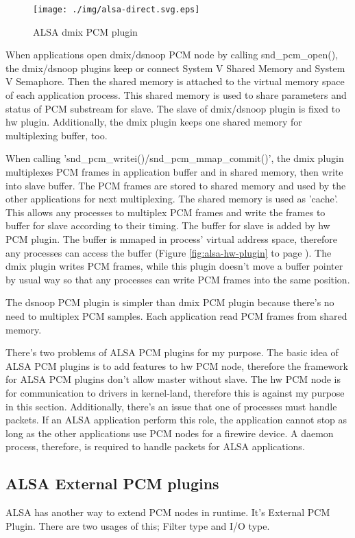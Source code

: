 \documentclass[onecolumn]{article}
\begin{document}
\begin{figure}[htbp]
	\centering
	\texttt{[image: ./img/alsa-direct.svg.eps]}
	\caption{ALSA dmix PCM plugin}
	\label{alsa_direct}
\end{figure}


When applications open dmix/dsnoop PCM node by calling snd\_pcm\_open(), the dmix/dsnoop plugins keep or connect System V Shared Memory and System V Semaphore. Then the shared memory is attached to the virtual memory space of each application process. This shared memory is used to share parameters and status of PCM substream for slave. The slave of dmix/dsnoop plugin is fixed to hw plugin. Additionally, the dmix plugin keeps one shared memory for multiplexing buffer, too.

When calling 'snd\_pcm\_writei()/snd\_pcm\_mmap\_commit()', the dmix plugin multiplexes PCM frames in application buffer and in shared memory, then write into slave buffer. The PCM frames are stored to shared memory and used by the other applications for next multiplexing. The shared memory is used as 'cache'. This allows any processes to multiplex PCM frames and write the frames to buffer for slave according to their timing. The buffer for slave is added by hw PCM plugin. The buffer is mmaped in process' virtual address space, therefore any processes can access the buffer (Figure \ref{fig:alsa-hw-plugin} to page \pageref{fig:alsa-hw-plugin}). The dmix plugin writes PCM frames, while this plugin doesn't move a buffer pointer by usual way so that any processes can write PCM frames into the same position.

The dsnoop PCM plugin is simpler than dmix PCM plugin because there's no need to multiplex PCM samples. Each application read PCM frames from shared memory.

There's two problems of ALSA PCM plugins for my purpose. The basic idea of ALSA PCM plugins is to add features to hw PCM node, therefore the framework for ALSA PCM plugins don't allow master without slave. The hw PCM node is for communication to drivers in kernel-land, therefore this is against my purpose in this section. Additionally, there's an issue that one of processes must handle packets. If an ALSA application perform this role, the application cannot stop as long as the other applications use PCM nodes for a firewire device. A daemon process, therefore, is required to handle packets for ALSA applications.


\subsection{ALSA External PCM plugins}
ALSA has another way to extend PCM nodes in runtime. It's External PCM Plugin\cite{alsa-lib}. There are two usages of this; Filter type and I/O type.
\end{document}
